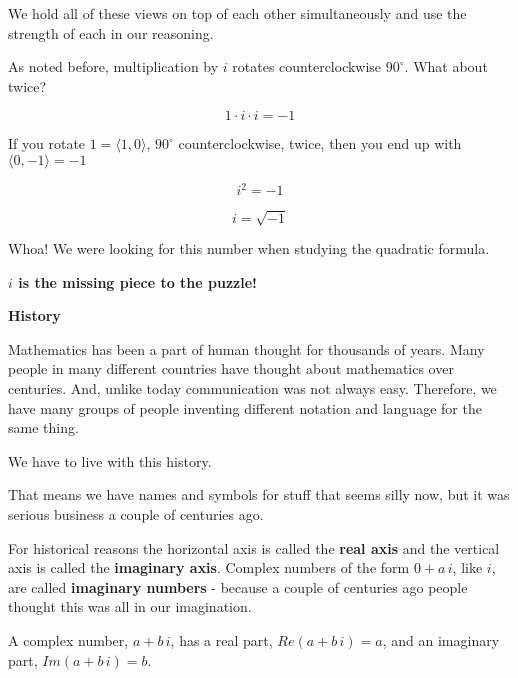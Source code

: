 \documentclass{ximera}
\begin{document}
We hold all of these views on top of each other simultaneously and use the strength of each in our reasoning.





As noted before, multiplication by $i$ rotates counterclockwise $90^{\circ}$. What about twice?


\[  1 \cdot i \cdot i = -1    \]



If you rotate $1 = \langle 1, 0 \rangle$, $90^{\circ}$ counterclockwise, twice, then  you end up with $\langle 0,-1 \rangle = -1$





\[   i^2 = -1\]



\[   i = \sqrt{-1}   \]




Whoa!  We were looking for this number when studying the quadratic formula.  


\begin{center}
\textbf{\textcolor{red!80!black}{$i$ is the missing piece to the puzzle!}}
\end{center}








\textbf{\textcolor{purple!50!blue!90!black}{History}}


Mathematics has been a part of human thought for thousands of years.  Many people in many different countries have thought about mathematics over centuries.  And, unlike today communication was not always easy.  Therefore, we have many groups of people inventing different notation and language for the same thing.  

We have to live with this history.

That means we have names and symbols for stuff that seems silly now, but it was serious business a couple of centuries ago.

For historical reasons the horizontal axis is called the \textbf{real axis} and the vertical axis is called the \textbf{imaginary axis}.  Complex numbers of the form $0 + a \, i$, like $i$, are called \textbf{imaginary numbers} - because a couple of centuries ago people thought this was all in our imagination.


A complex number, $a + b \, i$, has a real part, $Re(a + b \, i)= a$, and an imaginary part, $Im( a + b \, i)= b$.
\end{document}
